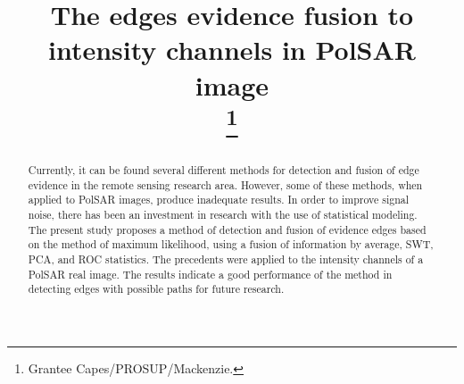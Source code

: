 \documentclass[conference]{IEEEtran}
\begin{document}
\title{The edges evidence fusion to intensity channels in
PolSAR image\\
\thanks{Grantee Capes/PROSUP/Mackenzie.}
}

\author{
\and
{}
\and
{}
}

\maketitle

\begin{abstract}
Currently, it can be found several different methods for detection and fusion of edge evidence in the remote sensing research area. However, some of these methods, when applied to PolSAR images, produce inadequate results. In order to improve signal noise, there has been an investment in research with the use of statistical modeling. The present study proposes a method of detection and fusion of evidence edges based on the method of maximum likelihood, using a fusion of information by average, SWT, PCA, and ROC statistics. The precedents were applied to the intensity channels of a PolSAR real image. The results indicate a good performance of the method in detecting edges with possible paths for future research.
\end{abstract}
\end{document}
